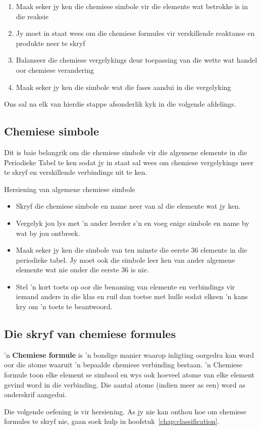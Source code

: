 \begin{enumerate}[noitemsep, label=\textbf{\arabic*}. ] 
\item Maak seker jy ken die chemiese simbole vir die elemente wat betrokke is in die reaksie
\item Jy moet in staat wees om die chemiese formules vir verskillende reaktanse en produkte neer te skryf
\item Balanseer die chemiese vergelykings deur toepassing van die wette wat handel oor chemiese verandering 
\item Maak seker jy ken die simbole wat die fases aandui in die vergelyking
\end{enumerate}
Ons sal na elk van hierdie stappe afsonderlik kyk in die volgende afdelings.
    \label{m38721*cid2}
            \subsection*{Chemiese simbole}
            \nopagebreak
Dit is baie belangrik om die chemiese simbole vir die algemene elemente in die Periodieke Tabel te ken
sodat jy in staat sal wees om chemiese vergelykings neer te skryf en verskillende verbindings uit te ken.\\
            \begin{activity}{Hersiening van algemene chemiese simbole}
            \nopagebreak
      \label{m38721*id62763}\begin{itemize}[noitemsep]
            \label{m38721*uid5}\item Skryf die chemiese simbole en name neer van al die elemente wat jy ken.
\label{m38721*uid6}\item Vergelyk jou lys met 'n ander leerder s’n en voeg enige simbole en name by wat by jou ontbreek.
\label{m38721*uid7}\item Maak seker jy ken die simbole van ten minste die eerste 36 elemente in die periodieke tabel. Jy moet ook die simbole leer ken van ander algemene elemente wat nie onder die eerste 36 is nie.
\label{m38721*uid8}\item Stel 'n kort toets op oor die benaming van elemente en verbindings vir iemand anders in die klas en ruil dan toetse met hulle sodat elkeen  'n kans kry om  'n toets te beantwoord.
\end{itemize}
\end{activity}
    \label{m38721*cid3}
\subsection*{Die skryf van chemiese formules}
\nopagebreak
\label{m38721*id62835} 'n \textbf{Chemiese formule} is 'n bondige manier waarop inligting oorgedra kan word oor die atome waaruit 'n bepaalde chemiese verbinding bestaan. 'n Chemiese formule toon elke element se simbool en wys ook hoeveel atome van elke element gevind word in die verbinding. Die aantal atome (indien meer as een) word as onderskrif aangedui.\par 
Die volgende oefening is vir hersiening. As jy nie kan onthou hoe om chemiese formules te skryf nie, gaan soek hulp in hoofstuk~\ref{chap:classification}.


